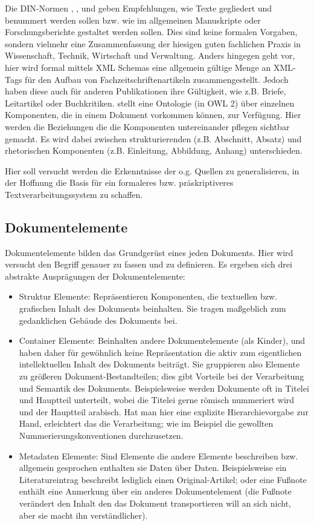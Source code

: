  
Die DIN-Normen \citep{DIN1421}, \citep{DIN1422-1}, \citep{DIN1422-3} und \citep{DIN1422-4} geben Empfehlungen, wie Texte gegliedert und benummert werden sollen bzw. wie im allgemeinen Manuskripte oder Forschungsberichte gestaltet werden sollen. Dies sind keine formalen Vorgaben, sondern vielmehr eine Zusammenfassung der hiesigen guten fachlichen Praxis in Wissenschaft, Technik, Wirtschaft und Verwaltung. Anders hingegen geht \citep{NISO} vor, hier wird formal mittels XML Schemas eine allgemein gültige Menge an XML-Tags für den Aufbau von Fachzeitschriftenartikeln zusammengestellt. Jedoch haben diese auch für anderen Publikationen ihre Gültigkeit, wie z.B. Briefe, Leitartikel oder Buchkritiken. \citep{Peroni} stellt eine Ontologie (in OWL 2) über einzelnen Komponenten, die in einem Dokument vorkommen können, zur Verfügung. Hier werden die Beziehungen die die Komponenten untereinander pflegen sichtbar gemacht. Es wird dabei zwischen strukturierenden (z.B. Abschnitt, Absatz) und rhetorischen Komponenten (z.B. Einleitung, Abbildung, Anhang) unterschieden.

 
Hier soll versucht werden die Erkenntnisse der o.g. Quellen zu generalisieren, in der Hoffnung die Basis für ein formaleres bzw. präskriptiveres Textverarbeitungssystem zu schaffen.

 
\subsection{Dokumentelemente}\label{dokumentelemente}
 
Dokumentelemente bilden das Grundgerüst eines jeden Dokuments. Hier wird versucht den Begriff genauer zu fassen und zu definieren. Es ergeben sich drei abstrakte Ausprägungen der Dokumentelemente:

 
\begin{itemize}

\item Struktur Elemente: Repräsentieren Komponenten, die textuellen bzw. grafischen Inhalt des Dokuments beinhalten. Sie tragen maßgeblich zum gedanklichen Gebäude des Dokuments bei.
\item Container Elemente: Beinhalten andere Dokumentelemente (als Kinder), und haben daher für gewöhnlich keine Repräsentation die aktiv zum eigentlichen intellektuellen Inhalt des Dokuments beiträgt. Sie gruppieren also Elemente zu größeren Dokument-Bestandteilen; dies gibt Vorteile bei der Verarbeitung und Semantik des Dokuments. Beispielsweise werden Dokumente oft in Titelei und Hauptteil unterteilt, wobei die Titelei gerne römisch nummeriert wird und der Hauptteil arabisch. Hat man hier eine explizite Hierarchievorgabe zur Hand, erleichtert das die Verarbeitung; wie im Beispiel die gewollten Nummerierungskonventionen durchzusetzen.
\item Metadaten Elemente: Sind Elemente die andere Elemente beschreiben bzw. allgemein gesprochen enthalten sie Daten über Daten. Beispielsweise ein Literatureintrag beschreibt lediglich einen Original-Artikel; oder eine Fußnote enthält eine Anmerkung über ein anderes Dokumentelement (die Fußnote verändert den Inhalt den das Dokument transportieren will an sich nicht, aber sie macht ihn verständlicher).
\end{itemize}
 
